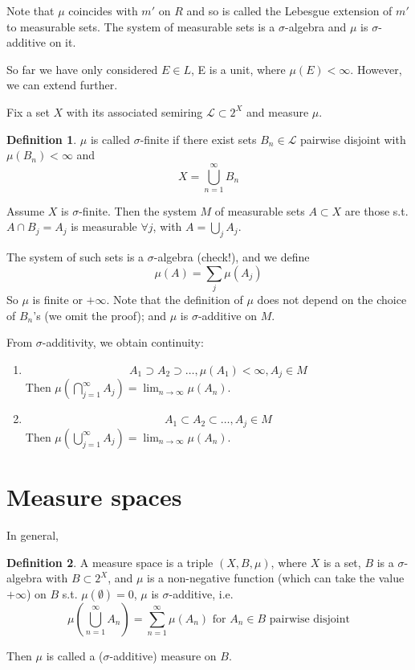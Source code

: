 \documentclass[11pt,a4paper]{report}
\theoremstyle{plain}
\theoremstyle{definition}
\newtheorem*{defn}{Definition}
\theoremstyle{remark}
\newcommand{\intersection}{\cap}
\newcommand{\Union}{\bigcup}
\newcommand{\Intersection}{\bigcap}
\newcommand{\cL}{\mathcal{L}}
\begin{document}
Note that $\mu$ coincides with $m'$ on $R$ and so is called the Lebesgue extension of $m'$ to measurable sets. The system of measurable sets is a $\sigma$-algebra and $\mu$ is $\sigma$-additive on it.

So far we have only considered $E \in L$, E is a unit, where $\mu(E) < \infty$. However, we can extend further.

Fix a set $X$ with its associated semiring $\cL \subset 2^X$ and measure $\mu$.

\begin{defn}
  $\mu$ is called $\sigma$-finite if there exist sets $B_n \in \cL$ pairwise disjoint with $\mu(B_n) < \infty$ and 
  $$ X = \Union_{n=1}^\infty B_n $$
\end{defn}
    
Assume $X$ is $\sigma$-finite. Then the system $M$ of measurable sets $A \subset X$ are those s.t. $A \intersection B_j = A_j$ is measurable $\forall j$, with $A = \Union_j A_j$.

The system of such sets is a $\sigma$-algebra (check!), and we define $$\mu(A) = \sum_j \mu(A_j)$$ So $\mu$ is finite or $+\infty$. Note that the definition of $\mu$ does not depend on the choice of $B_n$'s (we omit the proof); and $\mu$ is $\sigma$-additive on $M$.

From $\sigma$-additivity, we obtain continuity:
\begin{enumerate}
  \item{ $$ A_1 \supset A_2 \supset \dots, \mu(A_1) < \infty, A_j \in M $$ Then $\mu(\Intersection_{j=1}^\infty A_j) = \lim_{n \rightarrow \infty} \mu(A_n)$. }
  \item{ $$ A_1 \subset A_2 \subset \dots, A_j \in M $$ Then $\mu(\Union_{j=1}^\infty A_j) = \lim_{n \rightarrow \infty} \mu(A_n)$.}
\end{enumerate}

\section{Measure spaces}

In general,

\begin{defn}
    A measure space is a triple $(X, B, \mu)$, where $X$ is a set, $B$ is a $\sigma$-algebra with $B \subset 2^X$, and $\mu$ is a non-negative function (which can take the value $+\infty$) on $B$ s.t. $\mu(\emptyset) = 0$, $\mu$ is $\sigma$-additive, i.e.
    $$ \mu (\Union_{n=1}^\infty A_n) = \sum_{n=1}^\infty \mu(A_n) \text{ for $A_n \in B$ pairwise disjoint} $$

    Then $\mu$ is called a ($\sigma$-additive) measure on $B$.
\end{defn}
\end{document}

